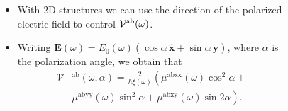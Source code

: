 \documentclass{beamer}
\begin{document}
\begin{frame}

{\small

\begin{columns}


\begin{itemize}

\item 
With 2D structures we can use the  direction of the polarized  electric field
to control ${\cal V}^{\mathrm{a}\mathrm{b}}(\omega)$.

\vspace{3mm}

\item 
Writing ${\mathbf E}(\omega) =
E_0(\omega)(\cos\alpha\,\hat{\mathbf x}+\sin\alpha\,\hat{\mathbf y})$, where
$\alpha$ is the polarization angle, we obtain that
\begin{align}
\mathcal{V}&^{\mathrm{ab}}(\omega,\alpha)
= 
\frac{2}{\hbar\xi(\omega)}
\left(\mu^{\mathrm{abxx}}(\omega)\cos^{2}\alpha + \right. \nonumber \\
&\left. \mu^{\mathrm{abyy}}(\omega)\sin^{2}\alpha + 
\mu^{\mathrm{abxy}}(\omega)\sin 2\alpha\right).
\label{eq:vab-aw}
\end{align}

\end{itemize}


\vspace{-4mm}

\begin{figure}[h!]
\end{figure}
\end{columns}}
\end{frame}
\end{document}
